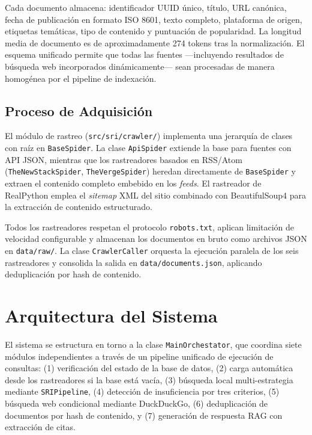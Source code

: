 \documentclass[runningheads,a4paper]{llncs}
\begin{document}
Cada documento almacena: identificador UUID único, título, URL canónica, fecha de publicación en formato ISO 8601, texto completo, plataforma de origen, etiquetas temáticas, tipo de contenido y puntuación de popularidad. La longitud media de documento es de aproximadamente 274 tokens tras la normalización. El esquema unificado permite que todas las fuentes —incluyendo resultados de búsqueda web incorporados dinámicamente— sean procesadas de manera homogénea por el pipeline de indexación.

\subsection{Proceso de Adquisición}

El módulo de rastreo (\texttt{src/sri/crawler/}) implementa una jerarquía de clases con raíz en \texttt{BaseSpider}. La clase \texttt{ApiSpider} extiende la base para fuentes con API JSON, mientras que los rastreadores basados en RSS/Atom (\texttt{TheNewStackSpider}, \texttt{TheVergeSpider}) heredan directamente de \texttt{BaseSpider} y extraen el contenido completo embebido en los \emph{feeds}. El rastreador de RealPython emplea el \emph{sitemap} XML del sitio combinado con BeautifulSoup4 para la extracción de contenido estructurado.

Todos los rastreadores respetan el protocolo \texttt{robots.txt}, aplican limitación de velocidad configurable y almacenan los documentos en bruto como archivos JSON en \texttt{data/raw/}. La clase \texttt{CrawlerCaller} orquesta la ejecución paralela de los seis rastreadores y consolida la salida en \texttt{data/documents.json}, aplicando deduplicación por hash de contenido.

\section{Arquitectura del Sistema}

El sistema se estructura en torno a la clase \texttt{MainOrchestator}, que coordina siete módulos independientes a través de un pipeline unificado de ejecución de consultas: (1) verificación del estado de la base de datos, (2) carga automática desde los rastreadores si la base está vacía, (3) búsqueda local multi-estrategia mediante \texttt{SRIPipeline}, (4) detección de insuficiencia por tres criterios, (5) búsqueda web condicional mediante DuckDuckGo, (6) deduplicación de documentos por hash de contenido, y (7) generación de respuesta RAG con extracción de citas.
\end{document}
